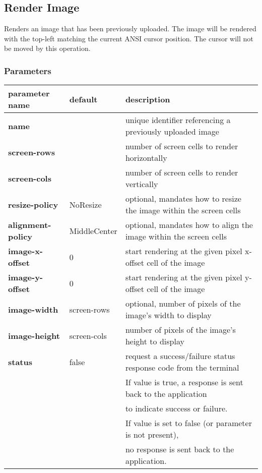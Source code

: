 \documentclass[a4paper]{article}
\begin{document}
\subsection{Render Image}

Renders an image that has been previously uploaded.
The image will be rendered with the top-left matching the current ANSI cursor position.
The cursor will not be moved by this operation.

\subsubsection*{Parameters}

\begin{tabular}{|l|l|l|}
    \hline
    \textbf{parameter name} & \textbf{default} & \textbf{description} \\
    \hline
    \textbf{name} &           & unique identifier referencing a previously uploaded image \\
    \textbf{screen-rows} &    & number of screen cells to render horizontally \\
    \textbf{screen-cols} &    & number of screen cells to render vertically \\
    \textbf{resize-policy} & NoResize & optional, mandates how to resize the image within the screen cells \\
    \textbf{alignment-policy} & MiddleCenter & optional, mandates how to align the image within the screen cells \\
    \textbf{image-x-offset} & 0 & start rendering at the given pixel x-offset cell of the image \\
    \textbf{image-y-offset} & 0 & start rendering at the given pixel y-offset cell of the image \\
    \textbf{image-width}    & screen-rows & optional, number of pixels of the image's width to display \\
    \textbf{image-height}   & screen-cols & number of pixels of the image's height to display \\
    \textbf{status}         & false & request a success/failure status response code from the terminal \\
        & & If value is true, a response is sent back to the application \\
        & & to indicate success or failure. \\
        & & If value is set to false (or parameter is not present), \\
        & & no response is sent back to the application. \\
    \hline
\end{tabular}
\end{document}
